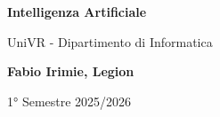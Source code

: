 \begin{titlepage}
	\begin{center}
		\vspace*{1cm}

		\Huge
		\textbf{Intelligenza Artificiale}

		\vspace{0.5cm}
		\LARGE
		UniVR - Dipartimento di Informatica

		\vspace{1.5cm}

		\textbf{Fabio Irimie, Legion}

		\vfill


		\vspace{0.8cm}


		1° Semestre 2025/2026

	\end{center}
\end{titlepage}
